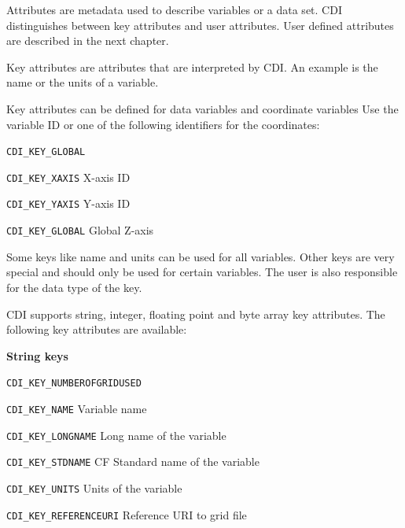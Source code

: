 Attributes are metadata used to describe variables or a data set.
CDI distinguishes between key attributes and user attributes.
User defined attributes are described in the next chapter.

Key attributes are attributes that are interpreted by CDI.
An example is the name or the units of a variable.

Key attributes can be defined for data variables and coordinate variables
Use the variable ID or one of the following identifiers for the coordinates:

\vspace*{3mm}
\hspace*{8mm}\begin{minipage}{15cm}
\begin{deflist}{\large\texttt{CDI\_KEY\_GLOBAL \ \ }}
\item[\large\texttt{CDI\_KEY\_XAXIS}]   X-axis ID
\item[\large\texttt{CDI\_KEY\_YAXIS}]   Y-axis ID 
\item[\large\texttt{CDI\_KEY\_GLOBAL}]   Global Z-axis
\end{deflist}
\end{minipage}
\vspace*{4mm}

Some keys like name and units can be used for all variables.
Other keys are very special and should only be used for certain variables.
The user is also responsible for the data type of the key.

CDI supports string, integer, floating point and byte array key attributes.
The following key attributes are available:

\textbf{String keys}

\vspace*{3mm}
\hspace*{8mm}\begin{minipage}{15cm}
\begin{deflist}{\large\texttt{CDI\_KEY\_NUMBEROFGRIDUSED \ \ }}
\item[\large\texttt{CDI\_KEY\_NAME}]   Variable name
\item[\large\texttt{CDI\_KEY\_LONGNAME}]   Long name of the variable
\item[\large\texttt{CDI\_KEY\_STDNAME}]   CF Standard name of the variable
\item[\large\texttt{CDI\_KEY\_UNITS}]   Units of the variable
\item[\large\texttt{CDI\_KEY\_REFERENCEURI}]   Reference URI to grid file
\end{deflist}
\end{minipage}
\vspace*{4mm}

